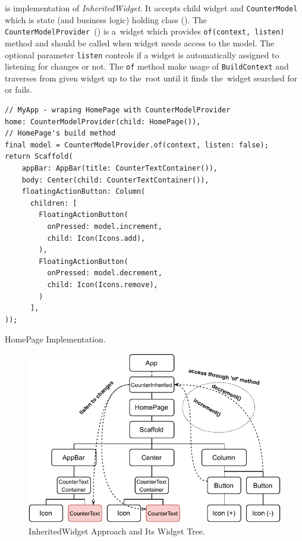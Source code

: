  is implementation of \textit{InheritedWidget}. It accepts child widget and \verb|CounterModel| which is state (and business logic) holding class (). The \verb|CounterModelProvider|~() is a~widget which provides \verb|of(context, listen)| method and should be called when widget needs access to the model. The optional parameter \verb|listen| controls if a widget is automatically assigned to listening for changes or not. The \verb|of| method make usage of \verb|BuildContext| and traverses from given widget up to the~root until it finds the~widget searched for or fails. 

\begin{listing}[ht]
\begin{verbatim}
// MyApp - wraping HomePage with CounterModelProvider
home: CounterModelProvider(child: HomePage()),
// HomePage's build method
final model = CounterModelProvider.of(context, listen: false);
return Scaffold(
    appBar: AppBar(title: CounterTextContainer()),
    body: Center(child: CounterTextContainer()),
    floatingActionButton: Column(
      children: [
        FloatingActionButton(
          onPressed: model.increment,
          child: Icon(Icons.add),
        ),
        FloatingActionButton(
          onPressed: model.decrement,
          child: Icon(Icons.remove),
        )
      ],
));
\end{verbatim}
\caption{HomePage Implementation.}
\label{listing:counter-inherited-homepage}
\end{listing}

\begin{figure}[h]
    \centering
    \includegraphics[width=0.75\linewidth]{img/flutter/counter-inherited-widget.pdf}
    \caption{InheritedWidget Approach and Its Widget Tree.}
    \label{fig:counter-app-inherited-widget}
\end{figure}

